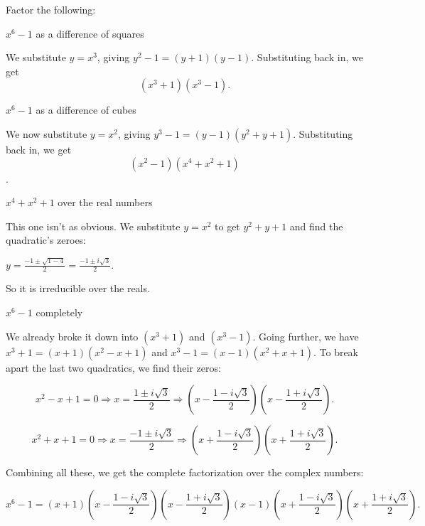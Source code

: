 \documentclass[../key.tex]{subfiles}
\begin{document}
\begin{outer_problem}
\item Factor the following:
\end{outer_problem}

\begin{inner_problem}[start=1]
\item $x^6-1$ as a difference of squares
\end{inner_problem}

We substitute $y=x^3$, giving $y^2-1=(y+1)(y-1)$. Substituting back in, we get $$(x^3+1)(x^3-1).$$

\begin{inner_problem}
\item $x^6-1$ as a difference of cubes
\end{inner_problem}

We now substitute $y=x^2$, giving $y^3-1 = (y-1)(y^2+y+1)$. Substituting back in, we get $$(x^2-1)(x^4+x^2+1)$$.

\begin{inner_problem}
\item $x^4+x^2+1$ over the real numbers
\end{inner_problem}

This one isn't as obvious. We substitute $y=x^2$ to get $y^2+y+1$ and find the quadratic's zeroes:

$y=\frac{-1\pm \sqrt{1 - 4}}{2} = \frac{-1\pm i\sqrt{3}}{2}.$

So it is irreducible over the reals.

\begin{inner_problem}
\item $x^6-1$ completely
\end{inner_problem}

We already broke it down into $(x^3+1)$ and $(x^3-1)$. Going further, we have $x^3+1 = (x+1)(x^2-x+1)$ and $x^3-1=(x-1)(x^2+x+1)$. To break apart the last two quadratics, we find their zeros:

$$x^2-x+1=0 \Longrightarrow x = \frac{1 \pm i\sqrt{3}}{2} \Longrightarrow \left(x - \frac{1 - i\sqrt{3}}{2}\right) \left(x - \frac{1 + i\sqrt{3}}{2}\right).$$

$$x^2+x+1=0 \Longrightarrow x = \frac{-1 \pm i\sqrt{3}}{2} \Longrightarrow \left(x + \frac{1 - i\sqrt{3}}{2}\right) \left(x + \frac{1 + i\sqrt{3}}{2}\right).$$

Combining all these, we get the complete factorization over the complex numbers:

$$x^6-1 = (x+1)\left(x - \frac{1 - i\sqrt{3}}{2}\right) \left(x - \frac{1 + i\sqrt{3}}{2}\right)(x-1)\left(x + \frac{1 - i\sqrt{3}}{2}\right) \left(x + \frac{1 + i\sqrt{3}}{2}\right).$$
\end{document}
